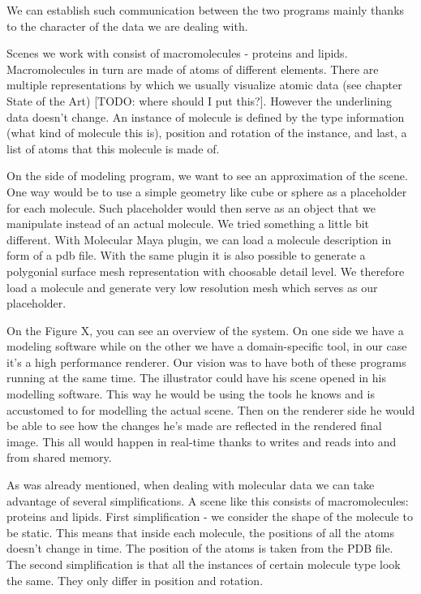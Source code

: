 \documentclass[
  digital, %
  table,   %
  nolof,     %
  nolot,     %
]{fithesis3}
\begin{document}
We can establish such communication between the two programs mainly thanks to the character of the data we are dealing with.

Scenes we work with consist of macromolecules - proteins and lipids. Macromolecules in turn are made of atoms of different elements. There are multiple representations by which we usually visualize atomic data (see chapter State of the Art) [TODO: where should I put this?]. However the underlining data doesn't change. An instance of molecule is defined by the type information (what kind of molecule this is), position and rotation of the instance, and last, a list of atoms that this molecule is made of.

On the side of modeling program, we want to see an approximation of the scene. One way would be to use a simple geometry like cube or sphere as a placeholder for each molecule. Such placeholder would then serve as an object that we manipulate instead of an actual molecule. We tried something a little bit different. With Molecular Maya plugin, we can load a molecule description in form of a pdb file. With the same plugin it is also possible to generate a polygonial surface mesh representation with choosable detail level. We therefore load a molecule and generate very low resolution mesh which serves as our placeholder.

On the Figure X, you can see an overview of the system. On one side we have a modeling software while on the other we have a domain-specific tool, in our case it's a high performance renderer. Our vision was to have both of these programs running at the same time. The illustrator could have his scene opened in his modelling software. This way he would be using the tools he knows and is accustomed to for modelling the actual scene. Then on the renderer side he would be able to see how the changes he's made are reflected in the rendered final image. This all would happen in real-time thanks to writes and reads into and from shared memory.

As was already mentioned, when dealing with molecular data we can take advantage of several simplifications. A scene like this consists of macromolecules: proteins and lipids. First simplification - we consider the shape of the molecule to be static. This means that inside each molecule, the positions of all the atoms doesn't change in time. The position of the atoms is taken from the PDB file. The second simplification is that all the instances of certain molecule type look the same. They only differ in position and rotation.
\end{document}
